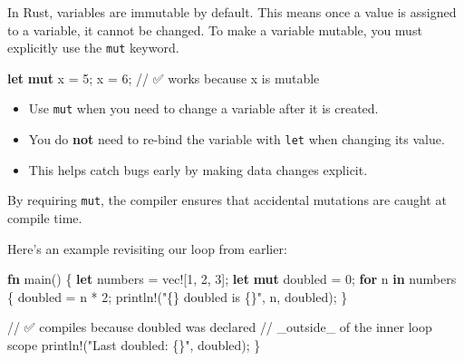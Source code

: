 \documentclass[
  letterpaper,
  DIV=11,
  numbers=noendperiod,
  oneside]{scrreprt}
\newenvironment{Shaded}{\begin{snugshade}}{\end{snugshade}}
\newcommand{\CommentTok}[1]{\textcolor[rgb]{0.37,0.37,0.37}{#1}}
\newcommand{\ControlFlowTok}[1]{\textcolor[rgb]{0.00,0.23,0.31}{\textbf{#1}}}
\newcommand{\DecValTok}[1]{\textcolor[rgb]{0.68,0.00,0.00}{#1}}
\newcommand{\KeywordTok}[1]{\textcolor[rgb]{0.00,0.23,0.31}{\textbf{#1}}}
\newcommand{\NormalTok}[1]{\textcolor[rgb]{0.00,0.23,0.31}{#1}}
\newcommand{\OperatorTok}[1]{\textcolor[rgb]{0.37,0.37,0.37}{#1}}
\newcommand{\PreprocessorTok}[1]{\textcolor[rgb]{0.68,0.00,0.00}{#1}}
\newcommand{\StringTok}[1]{\textcolor[rgb]{0.13,0.47,0.30}{#1}}
\providecommand{\tightlist}{%
  \setlength{\itemsep}{0pt}\setlength{\parskip}{0pt}}\usepackage{longtable,booktabs,array}
\begin{document}
In Rust, variables are immutable by default. This means once a value is
assigned to a variable, it cannot be changed. To make a variable
mutable, you must explicitly use the \texttt{mut} keyword.

\begin{Shaded}
\begin{Highlighting}[]
\KeywordTok{let} \KeywordTok{mut}\NormalTok{ x }\OperatorTok{=} \DecValTok{5}\OperatorTok{;}
\NormalTok{x }\OperatorTok{=} \DecValTok{6}\OperatorTok{;} \CommentTok{// ✅ works because x is mutable}
\end{Highlighting}
\end{Shaded}

\begin{itemize}
\tightlist
\item
  Use \texttt{mut} when you need to change a variable after it is
  created.
\item
  You do \textbf{not} need to re-bind the variable with \texttt{let}
  when changing its value.
\item
  This helps catch bugs early by making data changes explicit.
\end{itemize}


By requiring \texttt{mut}, the compiler ensures that accidental
mutations are caught at compile time.

Here's an example revisiting our loop from earlier:

\begin{Shaded}
\begin{Highlighting}[]
\KeywordTok{fn}\NormalTok{ main() }\OperatorTok{\{}
    \KeywordTok{let}\NormalTok{ numbers }\OperatorTok{=} \PreprocessorTok{vec!}\NormalTok{[}\DecValTok{1}\OperatorTok{,} \DecValTok{2}\OperatorTok{,} \DecValTok{3}\NormalTok{]}\OperatorTok{;}
    \KeywordTok{let} \KeywordTok{mut}\NormalTok{ doubled }\OperatorTok{=} \DecValTok{0}\OperatorTok{;}
    \ControlFlowTok{for}\NormalTok{ n }\KeywordTok{in}\NormalTok{ numbers }\OperatorTok{\{}
\NormalTok{        doubled }\OperatorTok{=}\NormalTok{ n }\OperatorTok{*} \DecValTok{2}\OperatorTok{;}
        \PreprocessorTok{println!}\NormalTok{(}\StringTok{"\{\} doubled is \{\}"}\OperatorTok{,}\NormalTok{ n}\OperatorTok{,}\NormalTok{ doubled)}\OperatorTok{;}
    \OperatorTok{\}}

    \CommentTok{// ✅ compiles because \textasciigrave{}doubled\textasciigrave{} was declared}
    \CommentTok{// \_outside\_ of the inner loop scope}
    \PreprocessorTok{println!}\NormalTok{(}\StringTok{"Last doubled: \{\}"}\OperatorTok{,}\NormalTok{ doubled)}\OperatorTok{;}
\OperatorTok{\}}
\end{Highlighting}
\end{Shaded}
\end{document}
